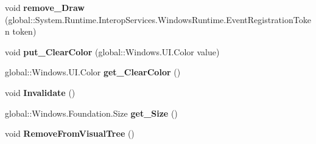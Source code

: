 \begin{DoxyCompactItemize}
\item 
\mbox{\label{interface_microsoft_1_1_graphics_1_1_canvas_1_1_u_i_1_1_xaml_1_1_i_canvas_control_a7d03879a3626825631ff4dd027e13037}} 
void {\bfseries remove\+\_\+\+Draw} (global\+::\+System.\+Runtime.\+Interop\+Services.\+Windows\+Runtime.\+Event\+Registration\+Token token)
\item 
\mbox{\label{interface_microsoft_1_1_graphics_1_1_canvas_1_1_u_i_1_1_xaml_1_1_i_canvas_control_a9b6277e93cd22ec62980077d6054abfa}} 
void {\bfseries put\+\_\+\+Clear\+Color} (global\+::\+Windows.\+U\+I.\+Color value)
\item 
\mbox{\label{interface_microsoft_1_1_graphics_1_1_canvas_1_1_u_i_1_1_xaml_1_1_i_canvas_control_a07569bdb3de20d484ad960b033c65d6d}} 
global\+::\+Windows.\+U\+I.\+Color {\bfseries get\+\_\+\+Clear\+Color} ()
\item 
\mbox{\label{interface_microsoft_1_1_graphics_1_1_canvas_1_1_u_i_1_1_xaml_1_1_i_canvas_control_a58180969617e4c94aa46ad9763ecfbd8}} 
void {\bfseries Invalidate} ()
\item 
\mbox{\label{interface_microsoft_1_1_graphics_1_1_canvas_1_1_u_i_1_1_xaml_1_1_i_canvas_control_a46bc807db80b81ae48b03fe7fd9ef0fc}} 
global\+::\+Windows.\+Foundation.\+Size {\bfseries get\+\_\+\+Size} ()
\item 
\mbox{\label{interface_microsoft_1_1_graphics_1_1_canvas_1_1_u_i_1_1_xaml_1_1_i_canvas_control_a6782a4dab5ff0be4ad3f21faab9d1837}} 
void {\bfseries Remove\+From\+Visual\+Tree} ()
\item 
\mbox{\label{interface_microsoft_1_1_graphics_1_1_canvas_1_1_u_i_1_1_xaml_1_1_i_canvas_control_ab71cfd94041b0c62d1f905ee5fe200b9}} 

\end{DoxyCompactItemize}
